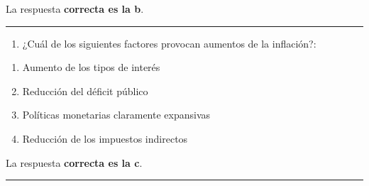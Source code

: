 \documentclass[
  letterpaper,
  DIV=11,
  numbers=noendperiod]{scrreprt}
\providecommand{\tightlist}{%
  \setlength{\itemsep}{0pt}\setlength{\parskip}{0pt}}\usepackage{longtable,booktabs,array}
\begin{document}
\begin{tcolorbox}[enhanced jigsaw, left=2mm, opacityback=0, colback=white, breakable, arc=.35mm, bottomrule=.15mm, rightrule=.15mm, toprule=.15mm, leftrule=.75mm, colframe=quarto-callout-tip-color-frame]
\begin{minipage}[t]{5.5mm}
\textcolor{quarto-callout-tip-color}{\faLightbulb}
\end{minipage}%
\begin{minipage}[t]{\textwidth - 5.5mm}

La respuesta \textbf{correcta es la b}.

\end{minipage}%
\end{tcolorbox}

\begin{center}\rule{0.5\linewidth}{0.5pt}\end{center}

\begin{enumerate}
\def\labelenumi{\arabic{enumi}.}
\setcounter{enumi}{55}
\tightlist
\item
  ¿Cuál de los siguientes factores provocan aumentos de la inflación?:
\end{enumerate}

\begin{enumerate}
\def\labelenumi{\alph{enumi}.}
\item
  Aumento de los tipos de interés
\item
  Reducción del déficit público
\item
  Políticas monetarias claramente expansivas
\item
  Reducción de los impuestos indirectos
\end{enumerate}

\begin{tcolorbox}[enhanced jigsaw, left=2mm, opacityback=0, colback=white, breakable, arc=.35mm, bottomrule=.15mm, rightrule=.15mm, toprule=.15mm, leftrule=.75mm, colframe=quarto-callout-tip-color-frame]
\begin{minipage}[t]{5.5mm}
\textcolor{quarto-callout-tip-color}{\faLightbulb}
\end{minipage}%
\begin{minipage}[t]{\textwidth - 5.5mm}

La respuesta \textbf{correcta es la c}.

\end{minipage}%
\end{tcolorbox}

\begin{center}\rule{0.5\linewidth}{0.5pt}\end{center}
\end{document}
